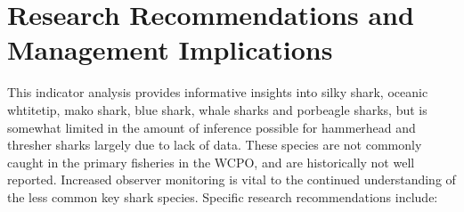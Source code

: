 \documentclass[12pt]{SCreport}
\begin{document}


\section{Research Recommendations and Management Implications}

This indicator analysis provides informative insights into silky shark, oceanic whtitetip, mako shark, blue shark, whale sharks and porbeagle sharks, but is somewhat limited in the amount of inference possible for hammerhead and thresher sharks largely due to lack of data. These species are not commonly caught in the primary fisheries in the WCPO, and are historically not well reported. Increased observer monitoring is vital to the continued understanding of the less common key shark species. Specific research recommendations include: 
 
\end{document}
